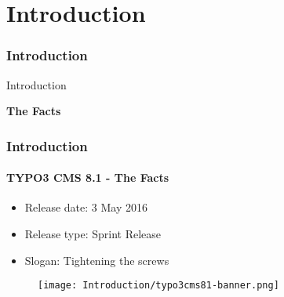 %

\section{Introduction}
\begin{frame}[fragile]
	\frametitle{Introduction}

	\begin{center}\huge{Introduction}\end{center}
	\begin{center}\huge{\color{typo3darkgrey}\textbf{The Facts}}\end{center}

\end{frame}

\begin{frame}[fragile]
	\frametitle{Introduction}
	\framesubtitle{TYPO3 CMS 8.1 - The Facts}

	\begin{itemize}
		\item Release date: 3 May 2016
		\item Release type: Sprint Release
		\item Slogan: Tightening the screws
	\end{itemize}

	\begin{figure}
		\texttt{[image: Introduction/typo3cms81-banner.png]}
	\end{figure}

\end{frame}

